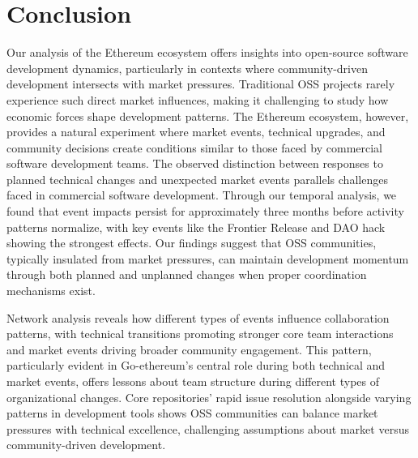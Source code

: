 \section{Conclusion}
\label{conclusion}


Our analysis of the Ethereum ecosystem offers insights into open-source software development dynamics, particularly in contexts where community-driven development intersects with market pressures. Traditional OSS projects rarely experience such direct market influences, making it challenging to study how economic forces shape development patterns. The Ethereum ecosystem, however, provides a natural experiment where market events, technical upgrades, and community decisions create conditions similar to those faced by commercial software development teams.
The observed distinction between responses to planned technical changes and unexpected market events parallels challenges faced in commercial software development. Through our temporal analysis, we found that event impacts persist for approximately three months before activity patterns normalize, with key events like the Frontier Release and DAO hack showing the strongest effects. Our findings suggest that OSS communities, typically insulated from market pressures, can maintain development momentum through both planned and unplanned changes when proper coordination mechanisms exist.

Network analysis reveals how different types of events influence collaboration patterns, with technical transitions promoting stronger core team interactions and market events driving broader community engagement. This pattern, particularly evident in Go-ethereum's central role during both technical and market events, offers lessons about team structure during different types of organizational changes. 
Core repositories' rapid issue resolution alongside varying patterns in development tools shows OSS communities can balance market pressures with technical excellence, challenging assumptions about market versus community-driven development.








